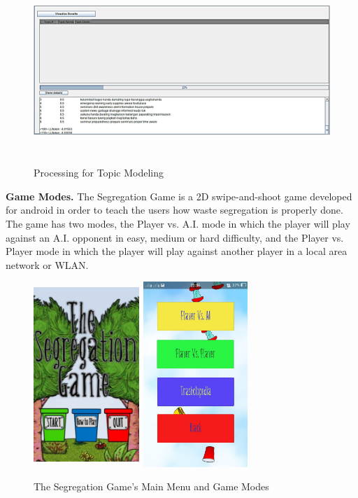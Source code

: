     \begin{figure}[H]
	\centering
	\includegraphics[width=13cm,height=7cm]{image/cs_figure3.png}
	\caption{Processing for Topic Modeling}
	\end{figure}

\textbf{Game Modes.} The Segregation Game is a 2D swipe-and-shoot game developed for android in order to teach the users how waste segregation is properly done. The game has two modes, the Player vs. A.I. mode in which the player will play against an A.I. opponent in easy, medium or hard difficulty, and the Player vs. Player mode in which the player will play against another player in a local area network or WLAN.

    \begin{figure}[H]
	\centering
	\includegraphics[width=4cm,height=7cm]{image/cs_figure4_1.jpg}
	\includegraphics[width=4cm,height=7cm]{image/cs_figure4_2.jpg}
	\caption{The Segregation Game’s Main Menu and Game Modes}
	\end{figure}

